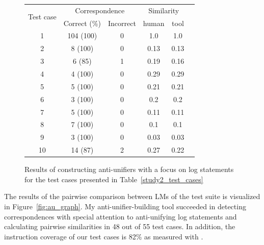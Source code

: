 \begin{figure}
  \centering
  \begin{tabular}{cccccc}
    \toprule
    \multirow{2}{*}{Test case}&\multicolumn{2}{c}{Correspondence}&\multicolumn{2}{c}{Similarity}\\
    \cmidrule(lr){2-3}
    \cmidrule(lr){4-5}
    &Correct (\%)&Incorrect&human&tool\\
    \midrule
    1&104 (100)&0& 1.0 & 1.0\\
    \midrule
    2&8 (100)&0& 0.13& 0.13\\
    \midrule
    3&6 (85)&1&0.19& 0.16\\
    \midrule
    4&4 (100)&0&0.29 &0.29\\
    \midrule
    5&5 (100)&0&0.21 &0.21\\
    \midrule
    6&3 (100)&0&0.2 &0.2\\
    \midrule
    7&5 (100)&0&0.11 &0.11\\
    \midrule
    8&7 (100)&0& 0.1&0.1\\
    \midrule
    9&3 (100)&0&0.03&0.03 \\
    \midrule
    10&14 (87)&2&0.27 &0.22\\
    \bottomrule
  \end{tabular}
  \caption{Results of constructing anti-unifiers with a focus on log statements for the test cases presented in  Table~\ref{study2_test_cases}}
  \label{study2_test_cases_results}
\end{figure}

The results of the pairwise comparison between LMs of the test suite is visualized in Figure~\ref{fig:au_graph}. My anti-unifier-building tool succeeded in detecting correspondences with special attention to anti-unifying log statements and calculating pairwise similarities in 48 out of 55 test cases. In addition, the instruction coverage of our test cases is 82\% as measured with .

